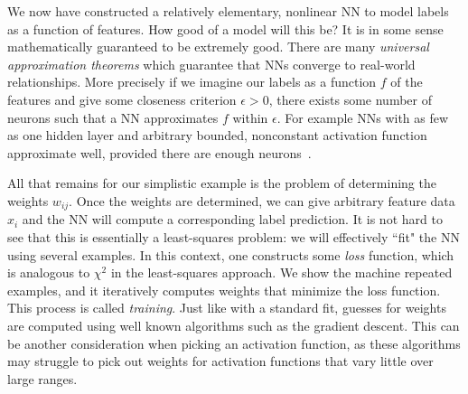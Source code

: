 We now have constructed a relatively elementary, nonlinear NN to 
model labels as a function of features. How good of a model will this be?
It is in some sense mathematically guaranteed to be extremely good.
There are many {\it universal approximation theorems} which guarantee that NNs converge to real-world
relationships. More precisely if we imagine our labels as a function $f$ of the
features and give some closeness criterion $\epsilon>0$, there exists some
number of neurons such that a NN approximates $f$ within $\epsilon$.
For example NNs with as few as one hidden layer and arbitrary bounded,
nonconstant activation function approximate well, provided there
are enough neurons~\cite{hornik_approximation_1991}.

All that remains for our simplistic example is the problem of determining
the weights $w_{ij}$. Once the weights are determined, we can give arbitrary
feature data $x_i$ and the NN will compute a corresponding label prediction. 
It is not hard to see that this is essentially a least-squares problem:
we will effectively ``fit" the NN using several examples.
In this context, one constructs some {\it loss} function,
which is analogous to $\chi^2$ in the least-squares approach.
We show the machine repeated examples, and it iteratively computes weights
that minimize the loss function. This process is called {\it
training}. Just like with a standard fit, guesses for weights
are computed using well known algorithms such as the gradient descent.
This can be another consideration when picking an activation function, as
these algorithms may struggle to pick out weights for activation functions 
that vary little over large ranges.

